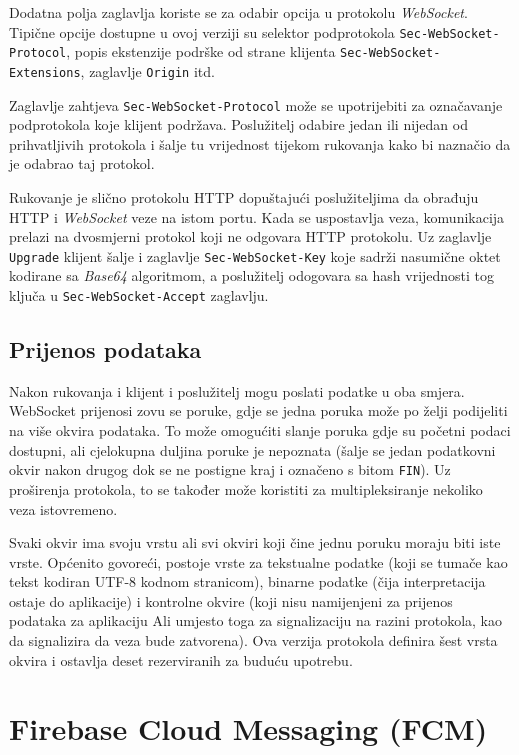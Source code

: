 \documentclass[times, utf8, zavrsni]{fer}
\begin{document}
{Dodatna polja zaglavlja koriste se za odabir opcija u protokolu {\em WebSocket}. Tipične opcije dostupne u ovoj verziji su selektor podprotokola {\tt Sec-WebSocket-Protocol}, popis ekstenzije podrške od strane klijenta {\tt Sec-WebSocket-Extensions}, zaglavlje {\tt Origin} itd. 

Zaglavlje zahtjeva {\tt Sec-WebSocket-Protocol} može se upotrijebiti za označavanje podprotokola koje klijent podržava. Poslužitelj odabire jedan ili nijedan od prihvatljivih protokola i šalje tu vrijednost tijekom rukovanja kako bi naznačio da je odabrao taj protokol.

Rukovanje je slično protokolu HTTP dopuštajući poslužiteljima da obrađuju HTTP i {\em WebSocket} veze na istom portu. Kada se uspostavlja veza, komunikacija prelazi na dvosmjerni protokol koji ne odgovara HTTP protokolu. Uz zaglavlje {\tt Upgrade} klijent šalje i zaglavlje {\tt Sec-WebSocket-Key} koje sadrži nasumične oktet kodirane sa {\em Base64} algoritmom, a poslužitelj odogovara sa hash vrijednosti tog ključa u {\tt Sec-WebSocket-Accept} zaglavlju.

\subsection{Prijenos podataka}
Nakon rukovanja i klijent i poslužitelj mogu poslati podatke u oba smjera. WebSocket prijenosi zovu se poruke, gdje se jedna poruka može po želji podijeliti na više okvira podataka. To može omogućiti slanje poruka gdje su početni podaci dostupni, ali cjelokupna duljina poruke je nepoznata (šalje se jedan podatkovni okvir nakon drugog dok se ne postigne kraj i označeno s bitom {\tt FIN}). Uz proširenja protokola, to se također može koristiti za multipleksiranje nekoliko veza istovremeno. 

Svaki okvir ima svoju vrstu ali svi okviri koji čine jednu poruku moraju biti iste vrste. Općenito govoreći, postoje vrste za tekstualne podatke (koji se tumače kao tekst kodiran UTF-8 kodnom stranicom), binarne podatke (čija interpretacija ostaje do aplikacije) i kontrolne okvire (koji nisu namijenjeni za prijenos podataka za aplikaciju Ali umjesto toga za signalizaciju na razini protokola, kao da signalizira da veza bude zatvorena). Ova verzija protokola definira šest vrsta okvira i ostavlja deset rezerviranih za buduću upotrebu.

\section{Firebase Cloud Messaging (FCM)}

}
\end{document}
